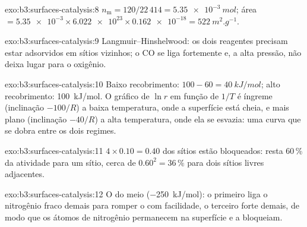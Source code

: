 \begin{solution}{exo:b3:surfaces-catalysis:8}
$n_{\mathrm m} = 120/22\,414 = \qty{5.35e-3}{mol}$; área $= \num{5.35e-3} \times \num{6.022e23} \times \num{0.162e-18} =
\qty{522}{m^2.g^{-1}}$.
\end{solution}

\begin{solution}{exo:b3:surfaces-catalysis:9}
Langmuir--Hinshelwood: os dois reagentes precisam estar adsorvidos em sítios vizinhos;
o CO se liga fortemente e, a alta pressão, não deixa lugar para o oxigênio.
\end{solution}

\begin{solution}{exo:b3:surfaces-catalysis:10}
Baixo recobrimento: $100 - 60 = \qty{40}{kJ/mol}$; alto recobrimento: \qty{100}{kJ/mol}. O gráfico de $\ln r$
em função de $1/T$ é íngreme (inclinação $-100/R$) a baixa temperatura, onde a superfície
está cheia, e mais plano (inclinação $-40/R$) a alta temperatura, onde ela se esvazia:
uma curva que se dobra entre os dois regimes.
\end{solution}

\begin{solution}{exo:b3:surfaces-catalysis:11}
$4 \times 0.10 = 0.40$ dos sítios estão bloqueados: resta 60\,\% da atividade para um
sítio, cerca de $0.60^2 = 36\,\%$ para dois sítios livres adjacentes.
\end{solution}

\begin{solution}{exo:b3:surfaces-catalysis:12}
O do meio (\qty{-250}{kJ/mol}): o primeiro liga o nitrogênio fraco demais para romper o
 com facilidade, o terceiro forte demais, de modo que os átomos de nitrogênio
permanecem na superfície e a bloqueiam.
\end{solution}

